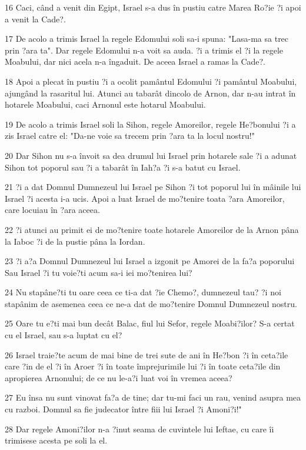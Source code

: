 \par 16 Caci, când a venit din Egipt, Israel s-a dus în pustiu catre Marea Ro?ie ?i apoi a venit la Cade?.
\par 17 De acolo a trimis Israel la regele Edomului soli sa-i spuna: "Lasa-ma sa trec prin ?ara ta". Dar regele Edomului n-a voit sa auda. ?i a trimis el ?i la regele Moabului, dar nici acela n-a îngaduit. De aceea Israel a ramas la Cade?.
\par 18 Apoi a plecat în pustiu ?i a ocolit pamântul Edomului ?i pamântul Moabului, ajungând la rasaritul lui. Atunci au tabarât dincolo de Arnon, dar n-au intrat în hotarele Moabului, caci Arnonul este hotarul Moabului.
\par 19 De acolo a trimis Israel soli la Sihon, regele Amoreilor, regele He?bonului ?i a zis Israel catre el: "Da-ne voie sa trecem prin ?ara ta la locul nostru!"
\par 20 Dar Sihon nu s-a învoit sa dea drumul lui Israel prin hotarele sale ?i a adunat Sihon tot poporul sau ?i a tabarât în Iah?a ?i s-a batut cu Israel.
\par 21 ?i a dat Domnul Dumnezeul lui Israel pe Sihon ?i tot poporul lui în mâinile lui Israel ?i acesta i-a ucis. Apoi a luat Israel de mo?tenire toata ?ara Amoreilor, care locuiau în ?ara aceea.
\par 22 ?i atunci au primit ei de mo?tenire toate hotarele Amoreilor de la Arnon pâna la Iaboc ?i de la pustie pâna la Iordan.
\par 23 ?i a?a Domnul Dumnezeul lui Israel a izgonit pe Amorei de la fa?a poporului Sau Israel ?i tu voie?ti acum sa-i iei mo?tenirea lui?
\par 24 Nu stapâne?ti tu oare ceea ce ti-a dat ?ie Chemo?, dumnezeul tau? ?i noi stapânim de asemenea ceea ce ne-a dat de mo?tenire Domnul Dumnezeul nostru.
\par 25 Oare tu e?ti mai bun decât Balac, fiul lui Sefor, regele Moabi?ilor? S-a certat cu el Israel, sau s-a luptat cu el?
\par 26 Israel traie?te acum de mai bine de trei sute de ani în He?bon ?i în ceta?ile care ?in de el ?i în Aroer ?i în toate împrejurimile lui ?i în toate ceta?ile din apropierea Arnonului; de ce nu le-a?i luat voi în vremea aceea?
\par 27 Eu însa nu sunt vinovat fa?a de tine; dar tu-mi faci un rau, venind asupra mea cu razboi. Domnul sa fie judecator între fiii lui Israel ?i Amoni?i!"
\par 28 Dar regele Amoni?ilor n-a ?inut seama de cuvintele lui Ieftae, cu care îi trimisese acesta pe soli la el.
